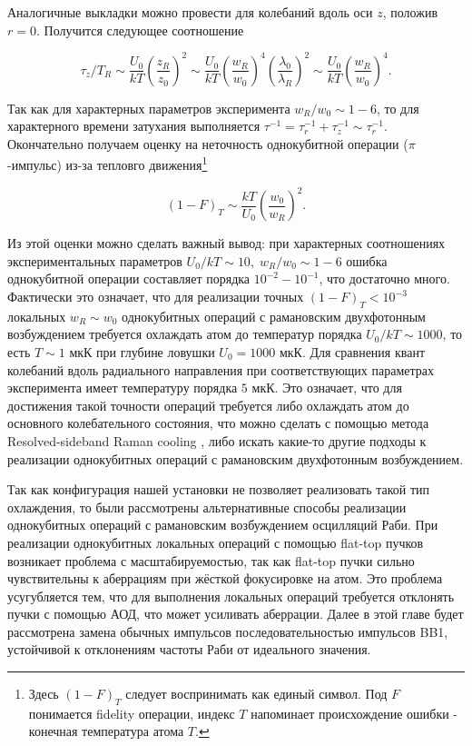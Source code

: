 Аналогичные выкладки можно провести для колебаний вдоль оси $z$, положив $r=0$. Получится следующее соотношение

\begin{equation}
	\tau_{z}/T_{R} \sim \frac{U_0}{kT}\left(\frac{z_{R}}{z_{0}}\right)^2 \sim \frac{U_0}{kT}\left(\frac{w_{R}}{w_{0}}\right)^4 \left(\frac{\lambda_{0}}{\lambda_{R}}\right)^2 \sim \frac{U_0}{kT}\left(\frac{w_{R}}{w_{0}}\right)^4.
\end{equation}

Так как для характерных параметров эксперимента $w_{R}/w_{0} \sim 1-6$, то для характерного времени затухания выполняется $\tau^{-1} = \tau_{r}^{-1} + \tau_{z}^{-1} \sim \tau_{r}^{-1}$. Окончательно получаем оценку на неточность однокубитной операции ($\pi$-импульс) из-за тепловго движения\footnote{Здесь $(1-F)_{T}$ следует воспринимать как единый символ. Под $F$ понимается fidelity операции, индекс $T$ напоминает происхождение ошибки - конечная температура атома $T$.}

\begin{equation}
	(1-F)_{T} \sim \frac{kT}{U_0}\left(\frac{w_0}{w_R}\right)^2.
\end{equation}

Из этой оценки можно сделать важный вывод: при характерных соотношениях экспериментальных параметров $U_0/kT \sim 10, \; w_R /w_0 \sim 1-6$ ошибка однокубитной операции составляет порядка $10^{-2}-10^{-1}$, что достаточно много. Фактически это означает, что для реализации точных $(1-F)_{T} < 10^{-3}$ локальных $w_{R} \sim w_0$ однокубитных операций с рамановским двухфотонным возбуждением требуется охлаждать атом до температур порядка $U_0/kT \sim 1000$, то есть $T \sim 1\text{ мкК}$ при глубине ловушки $U_0 = 1000 \text{ мкК}$. Для сравнения квант колебаний вдоль радиального направления при соответствующих параметрах эксперимента имеет температуру порядка $5 \text{ мкК}$. Это означает, что для достижения такой точности операций требуется либо охлаждать атом до основного колебательного состояния, что можно сделать с помощью метода Resolved-sideband Raman cooling \cite{Kaufman_2012,Thompson_2013}, либо искать какие-то другие подходы к реализации однокубитных операций с рамановским двухфотонным возбуждением.

Так как конфигурация нашей установки не позволяет реализовать такой тип охлаждения, то были рассмотрены альтернативные способы реализации однокубитных операций с рамановским возбуждением осцилляций Раби. При реализации однокубитных локальных операций с помощью flat-top пучков \cite{Gillen_Christandl_2016} возникает проблема с масштабируемостью, так как flat-top пучки сильно чувствительны к аберрациям \cite{Zupancic:16,Ebadi_2021} при жёсткой фокусировке на атом. Это проблема усугубляется тем, что для выполнения локальных операций требуется отклонять пучки с помощью АОД, что может усиливать аберрации. Далее в этой главе будет рассмотрена замена обычных импульсов последовательностью импульсов BB1, устойчивой к отклонениям частоты Раби от идеального значения. 

